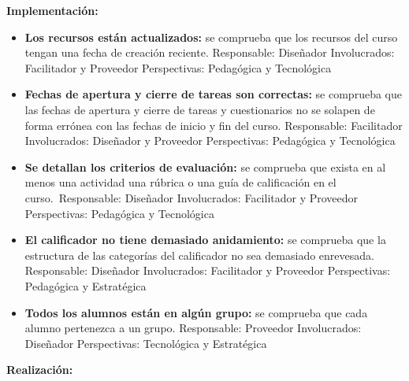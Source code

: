    \textbf{Implementación:}
    
    \begin{itemize}
    	\item
    	\textbf{Los recursos están actualizados:} se comprueba que los
    	recursos del curso tengan una fecha de creación reciente.
    	{Responsable:} Diseñador {Involucrados:} Facilitador y
    	Proveedor {Perspectivas:} Pedagógica y Tecnológica
    	\item
    	\textbf{Fechas de apertura y cierre de tareas son correctas:} se
    	comprueba que las fechas de apertura y cierre de tareas y
    	cuestionarios no se solapen de forma errónea con las fechas de inicio
    	y fin del curso. {Responsable:} Facilitador
    	{Involucrados:} Diseñador y Proveedor {Perspectivas:}
    	Pedagógica y Tecnológica
    	\item
    	\textbf{Se detallan los criterios de evaluación:} se comprueba que
    	exista en al menos una actividad una rúbrica o una guía de calificación
    	en el curso.~{Responsable:} Diseñador {Involucrados:}
    	Facilitador y Proveedor {Perspectivas:} Pedagógica y Tecnológica
    	\item
    	\textbf{El calificador no tiene demasiado anidamiento:} se comprueba
    	que la estructura de las categorías del calificador no sea demasiado
    	enrevesada. {Responsable:} Diseñador {Involucrados:}
    	Facilitador y Proveedor {Perspectivas:} Pedagógica y Estratégica
    	\item
    	\textbf{Todos los alumnos están en algún grupo:} se comprueba que cada
    	alumno pertenezca a un grupo. {Responsable:} Proveedor
    	{Involucrados:} Diseñador {Perspectivas:} Tecnológica y
    	Estratégica
    \end{itemize}
    
    \textbf{Realización:}
    

